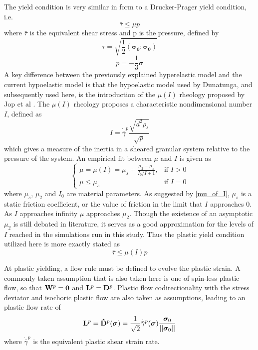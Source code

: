 The yield condition is very similar in form to a Drucker-Prager yield condition, i.e.
\begin{equation}
\bar{\tau} \leq \mu p \label{yield_condition}
\end{equation}
where $\bar{\tau}$ is the equivalent shear stress and p is the pressure, defined by
\begin{equation}
\bar{\tau}=\sqrt{\frac{1}{2}(\bm{\sigma_0}:\bm{\sigma_0})}\label{tau_bar}
\end{equation}
\begin{equation}
p=-\frac{1}{3}\bm{\sigma}\label{pressure_stress}
\end{equation}
A key difference between the previously explained hyperelastic model and the current hypoelastic model is that the hypoelastic model used by Dunatunga, and subsequently used here, is the introduction of the $\mu(I)$ rheology proposed by Jop et al \cite{Jop:2006:Constitutive}. The $\mu(I)$ rheology proposes a characteristic nondimensional number $I$, defined as
\begin{equation}
I=\dot{\bar{\gamma}}^p\frac{\sqrt{d^2\rho_s}}{\sqrt{p}} \label{inertial_number}
\end{equation}
which gives a measure of the inertia in a sheared granular system relative to the pressure of the system. An empirical fit between $\mu$ and $I$ is given as
\begin{equation}
\begin{cases}
	\mu=\mu(I)=\mu_s+\frac{\mu_2-\mu_s}{I_0/I+1}, & \text{if } I>0 \\
	\mu\leq \mu_s								 & \text{if } I=0
\end{cases}
\label{mu_of_I}
\end{equation}
where $\mu_s$, $\mu_2$ and $I_0$ are material parameters. As suggested by \ref{mu_of_I}, $\mu_s$ is a static friction coefficient, or the value of friction in the limit that $I$ approaches 0. As $I$ approaches infinity $\mu$ approaches $\mu_2$. Though the existence of an asymptotic $\mu_2$ is still debated in literature, it serves as a good approximation for the levels of $I$ reached in the simulations run in this study. Thus the plastic yield condition utilized here is more exactly stated as
\begin{equation}
\bar{\tau} \leq \mu(I) p \label{yield_condition_mu_of_I}
\end{equation}

At plastic yielding, a flow rule must be defined to evolve the plastic strain. A commonly taken assumption that is also taken here is one of spin-less plastic flow, so that $\bold{W}^p=\bold{0}$ and $\bold{L}^p=\bold{D}^p$. Plastic flow codirectionality with the stress deviator and isochoric plastic flow are also taken as assumptions, leading to an plastic flow rate of
\begin{equation}
\bold{L}^p=\bold{\hat{D}}^p(\bm{\sigma})=\frac{1}{\sqrt{2}}\dot{\bar{\gamma}}^p(\bm{\sigma})\frac{\bm{\sigma}_0}{||\bm{\sigma}_0||}\label{flow_rule}
\end{equation}
where $\dot{\bar{\gamma}}^p$ is the equivalent plastic shear strain rate.

